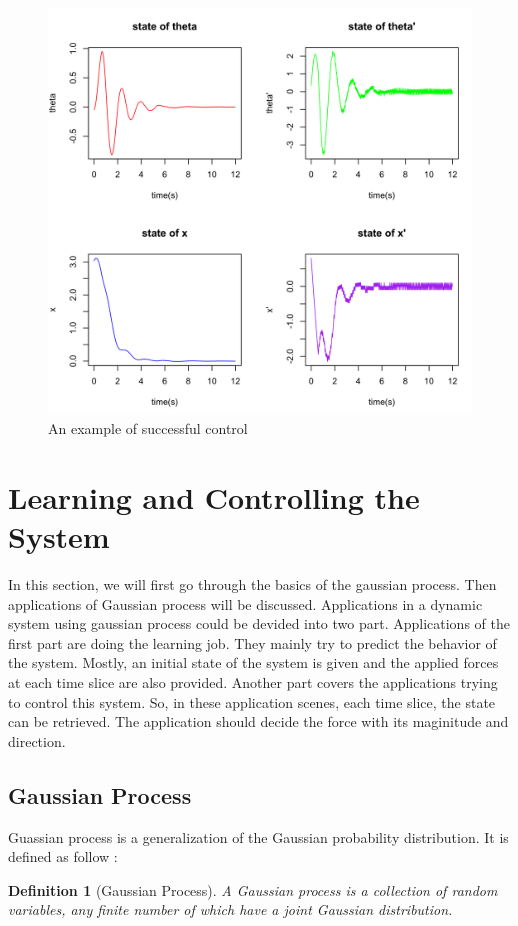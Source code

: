 \documentclass[11pt,twoside,a4paper]{article}
\newtheorem{mydef}{Definition}
\begin{document}
\begin{figure}[h!]
\begin{center}
\includegraphics[width=14cm]{success-control.png}
\caption{An example of successful control}
\label{success-control}
\end{center}
\end{figure}

\section{Learning and Controlling the System}
In this section, we will first go through the basics of the gaussian
process. Then applications of Gaussian process will be discussed.
Applications in a dynamic system using gaussian process could be
devided into two part. Applications of the first part are doing the
learning job. They mainly try to predict the behavior of the
system. Mostly, an initial state of the system is given and the
applied forces at each time slice are also provided. Another part
covers the applications trying to control this system. So, in these
application scenes, each time slice, the state can be retrieved. The
application should decide the force with its maginitude and
direction.\\
\subsection{Gaussian Process}
Guassian process is a generalization of the Gaussian probability
distribution. It is defined as follow \cite{Rasmussen2006}:
\begin{mydef}[Gaussian Process]
A Gaussian process is \textit{a collection of random variables, any finite
number of which have a joint Gaussian distribution}.
\end{mydef}
\end{document}

